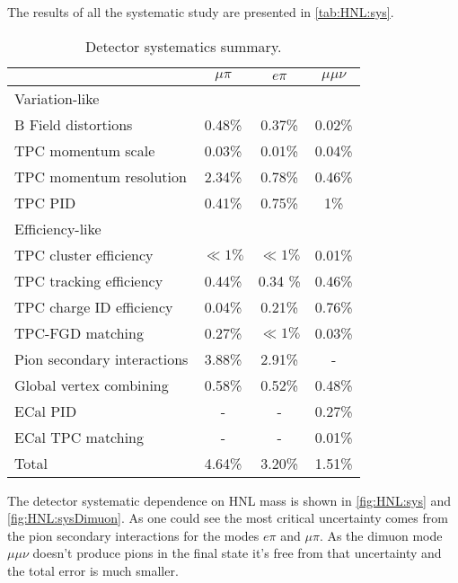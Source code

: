 \documentclass[../main.tex]{subfiles}
\begin{document}
The results of all the systematic study are presented in \autoref{tab:HNL:sys}.
\begin{table}[!ht]
\begin{center}
\begin{tabular}{|l |c| c| c|}
  \hline
   & $\mu\pi$ & $e\pi$ & $\mu\mu\nu$\\
  \hline
  \multicolumn{4}{||l|}{Variation-like} \\
  \hline
  B Field distortions                 & 0.48\%    & 0.37\%         &  0.02\%\\
  TPC momentum scale                  & 0.03\%    & 0.01\%         & 0.04\%\\
  TPC momentum resolution             & 2.34\%    & 0.78\%         & 0.46\%\\
  TPC PID                             & 0.41\%    & 0.75\%         & 1\%\\
  \hline
  \multicolumn{4}{||l|}{Efficiency-like} \\
  \hline
  TPC cluster efficiency              &   $\ll1\%$   &   $\ll1\%$  &  0.01\%\\
  TPC tracking efficiency             &   0.44\%     &  0.34 \%    & 0.46\% \\
  TPC charge ID efficiency            &   0.04\%     &   0.21\%    &   0.76\%\\
  TPC-FGD matching                    &   0.27\%     &    $\ll1\%$ & 0.03\%\\
  Pion secondary interactions         &   3.88\%     &   2.91\%    &  - \\
  Global vertex combining             &    0.58\%    &  0.52\%     & 0.48\%\\
  ECal PID                            &     -        &     -       & 0.27\%\\
  ECal TPC matching                   &     -        &     -       &  0.01\%\\
  \hline
  Total                               &   4.64\%     &  3.20\%     & 1.51\%\\
  \hline
\end{tabular}
\caption{Detector systematics summary.}
\label{tab:HNL:sys}
\end{center}
\end{table}

The detector systematic dependence on HNL mass is shown in \autoref{fig:HNL:sys} and \autoref{fig:HNL:sysDimuon}. As one could see the most critical uncertainty comes from the pion secondary interactions for the modes $e\pi$ and $\mu\pi$. As the dimuon mode $\mu\mu\nu$ doesn't produce pions in the final state it's free from that uncertainty and the total error is much smaller.
\end{document}
